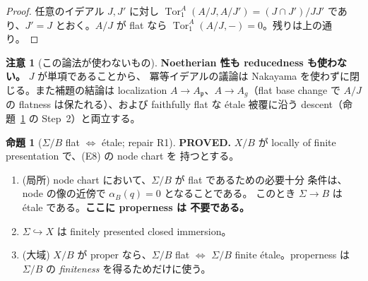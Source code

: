 \documentclass[11pt,a4paper]{article}
\numberwithin{equation}{section}
\theoremstyle{definition}
\newtheorem{proposition}[definition]{命題}
\newtheorem{remark}[definition]{注意}
\begin{document}
\begin{proof}
任意のイデアル \(J,J'\) に対し \(\operatorname{Tor}_1^A(A/J,A/J')
=(J\cap J')/JJ'\) であり、\(J'=J\) とおく。\(A/J\) が flat なら
\(\operatorname{Tor}_1^A(A/J,-)=0\)。残りは上の通り。
\end{proof}

\begin{remark}[この論法が使わないもの]\label{rem:no-noeth}
\textbf{Noetherian 性も reducedness も使わない。} \(J\) が単項であることから、
冪等イデアルの議論は Nakayama を使わずに閉じる。また補題の結論は
localization \(A\to A_{\mathfrak p}\)、\(A\to A_g\)（flat base change で
\(A/J\) の flatness は保たれる）、および faithfully flat な étale 被覆に沿う
descent（命題~\ref{prop:flat-etale} の Step~2）と両立する。
\end{remark}

\begin{proposition}[\(\Sigma/B\) flat $\Leftrightarrow$ étale; repair R1]
\label{prop:flat-etale}
\textbf{PROVED.} \(X/B\) が locally of finite presentation で、(E8) の node chart を
持つとする。
\begin{enumerate}[label=(\alph*)]
\item (局所) node chart において、\(\Sigma/B\) が flat であるための必要十分
  条件は、node の像の近傍で \(\alpha_B(q)=0\) となることである。
  このとき \(\Sigma\to B\) は étale である。\textbf{ここに properness は
  不要である。}
\item \(\Sigma\hookrightarrow X\) は finitely presented closed immersion。
\item (大域) \(X/B\) が proper なら、\(\Sigma/B\) flat \(\Leftrightarrow\)
  \(\Sigma/B\) finite étale。properness は \(\Sigma/B\) の \emph{finiteness}
  を得るためだけに使う。
\end{enumerate}
\end{proposition}
\end{document}
